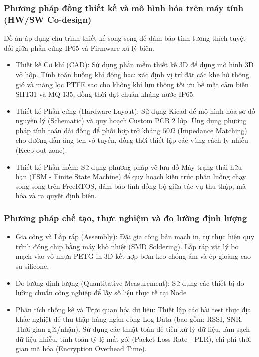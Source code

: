 \subsubsection{Phương pháp đồng thiết kế và mô hình hóa trên máy tính (HW/SW Co-design)}
Đồ án áp dụng chu trình thiết kế song song để đảm bảo tính tương thích tuyệt đối giữa phần cứng IP65 và Firmware xử lý biên. 
\begin{itemize}
    \item Thiết kế Cơ khí (CAD): Sử dụng phần mềm thiết kế 3D để dựng mô hình 3D vỏ hộp. Tính toán buồng khí động học: xác định vị trí đặt các khe hở thông gió và màng lọc PTFE sao cho không khí lưu thông tối ưu bề mặt cảm biến SHT31 và MQ-135, đồng thời đạt chuẩn kháng nước IP65.
    \item Thiết kế Phần cứng (Hardware Layout): Sử dụng Kicad để mô hình hóa sơ đồ nguyên lý (Schematic) và quy hoạch Custom PCB 2 lớp. Ứng dụng phương pháp tính toán dải đồng để phối hợp trở kháng $50 \Omega$ (Impedance Matching) cho đường dẫn ăng-ten vô tuyến, đồng thời thiết lập các vùng cách ly nhiễu (Keep-out zone).
    \item Thiết kế Phần mềm: Sử dụng phương pháp vẽ lưu đồ Máy trạng thái hữu hạn (FSM - Finite State Machine) để quy hoạch kiến trúc phân luồng chạy song song trên FreeRTOS, đảm bảo tính đồng bộ giữa tác vụ thu thập, mã hóa và ra quyết định biên.
\end{itemize}
\subsubsection{Phương pháp chế tạo, thực nghiệm và đo lường định lượng}
\begin{itemize}
    \item Gia công và Lắp ráp (Assembly): Đặt gia công bản mạch in, tự thực hiện quy trình đóng chip bằng máy khò nhiệt (SMD Soldering). Lắp ráp vật lý bo mạch vào vỏ nhựa PETG in 3D kết hợp bơm keo chống ẩm và ép gioăng cao su silicone.
    \item Đo lường định lượng (Quantitative Measurement): Sử dụng các thiết bị đo lường chuẩn công nghiệp để lấy số liệu thực tế tại Node
    \item Phân tích thống kê và Trực quan hóa dữ liệu: Thiết lập các bài test thực địa khắc nghiệt để thu thập hàng ngàn dòng Log Data (bao gồm: RSSI, SNR, Thời gian gửi/nhận). Sử dụng các thuật toán để tiền xử lý dữ liệu, làm sạch dữ liệu nhiễu, tính toán tỷ lệ mất gói (Packet Loss Rate - PLR), chi phí thời gian mã hóa (Encryption Overhead Time).
\end{itemize}
